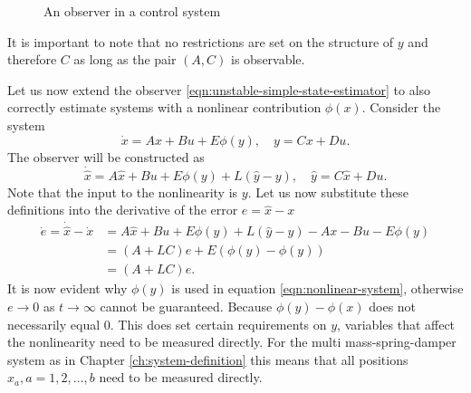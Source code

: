\begin{figure}[ht]
    \centering
    \caption{An observer in a control system}
    \label{fig:observer-diagram}
\end{figure}

It is important to note that no restrictions are set on the structure of $y$ and therefore $C$ as long as the pair $(A,C)$ is observable. 

Let us now extend the observer \eqref{eqn:unstable-simple-state-estimator} to also correctly estimate systems with a nonlinear contribution $\phi(x)$. Consider the system
\begin{equation*}\label{eqn:nonlinear-system}
    \dot{x} = Ax + Bu + E\phi(y), \quad y = Cx + Du.
\end{equation*}
The observer will be constructed as
\begin{equation}
    \dot{\hat{x}} = A\hat{x} + Bu + E\phi(y) + L(\hat{y} - y), \quad \hat{y} = C\hat{x} + Du.
\end{equation}
Note that the input to the nonlinearity is $y$. Let us now substitute these definitions into the derivative of the error $e=\hat{x}-x$
\begin{equation*}\label{eqn:errror-nonlinear-observer}
    \begin{split}
        \dot{e} = \dot{\hat{x}} - \dot{x} &= A\hat{x} + Bu + E\phi(y) + L(\hat{y} - y) - Ax - Bu - E\phi(y) \\
        &= (A+LC)e + E(\phi(y) - \phi(y)) \\
        &= (A+LC)e.
    \end{split}
\end{equation*}
It is now evident why $\phi(y)$ is used in equation \eqref{eqn:nonlinear-system}, otherwise $e \rightarrow 0$ as $t \rightarrow \infty$ cannot be guaranteed. Because $\phi(y) - \phi(x)$ does not necessarily equal $0$. This does set certain requirements on $y$, variables that affect the nonlinearity need to be measured directly. For the multi mass-spring-damper system as in Chapter \ref{ch:system-definition} this means that all positions $x_a,a=1,2,\dots,b$ need to be measured directly. \\

